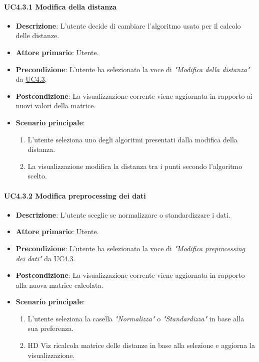 \paragraph{UC4.3.1 Modifica della distanza}
\label{par:uc4.3.1}
\begin{itemize}
    \item \textbf{Descrizione}: L’utente decide di cambiare l’algoritmo usato per il calcolo delle distanze.

    \item \textbf{Attore primario}: Utente.
    
    \item \textbf{Precondizione}:   L'utente ha selezionato la voce di \emph{"Modifica della distanza"} da \hyperref[ssub:uc4.3]{UC4.3}.
    \item \textbf{Postcondizione}:  La visualizzazione corrente viene aggiornata in rapporto ai nuovi valori della matrice.

	\item \textbf{Scenario principale}:
        \begin{enumerate}
            \item L'utente seleziona uno degli algoritmi presentati dalla modifica della distanza.
            \item La visualizzazione modifica la distanza tra i punti secondo l'algoritmo scelto.
        \end{enumerate}
\end{itemize}

\paragraph{UC4.3.2 Modifica preprocessing dei dati}
\label{par:uc4.3.2}
\begin{itemize}
    \item \textbf{Descrizione}: L’utente sceglie se normalizzare o standardizzare i dati.

    \item \textbf{Attore primario}: Utente.
    \item \textbf{Precondizione}: L'utente ha selezionato la voce di \emph{"Modifica preprocessing dei dati"} da \hyperref[ssub:uc4.3]{UC4.3}.
    \item \textbf{Postcondizione}: La visualizzazione corrente viene aggiornata in rapporto alla nuova matrice calcolata.
    \item \textbf{Scenario principale}:
    \begin{enumerate}
        \item L'utente seleziona la casella \emph{"Normalizza"} o \emph{"Standardizza"} in base alla sua preferenza.
        \item HD Viz ricalcola matrice delle distanze in base alla selezione e aggiorna la visualizzazione.
    \end{enumerate}
\end{itemize}


